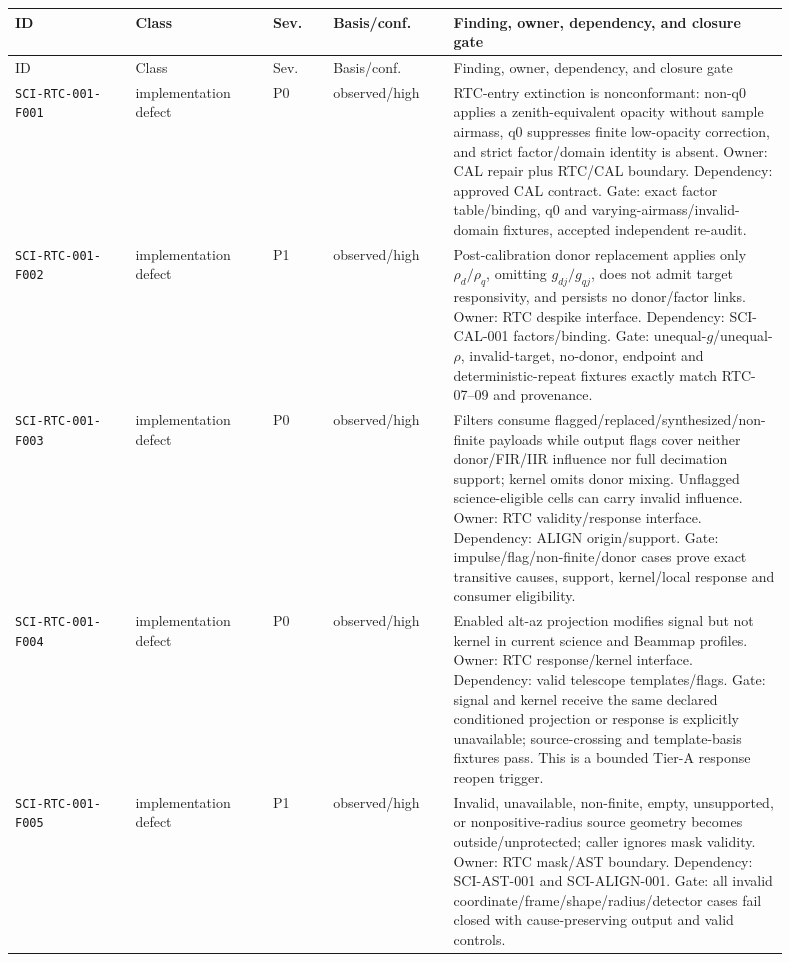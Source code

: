 \documentclass[11pt]{article}
\newcommand{\code}[1]{\nolinkurl{#1}}
\begin{document}
\begin{longtable}{@{}L{0.14\linewidth}L{0.16\linewidth}L{0.07\linewidth}L{0.14\linewidth}L{0.39\linewidth}@{}}
\toprule
ID & Class & Sev. & Basis/conf. & Finding, owner, dependency, and closure gate \\
\midrule
\endfirsthead
\toprule
ID & Class & Sev. & Basis/conf. & Finding, owner, dependency, and closure gate \\
\midrule
\endhead
\code{SCI-RTC-001-F001} & implementation defect & P0 & observed/high & RTC-entry extinction is nonconformant: non-q0 applies a zenith-equivalent opacity without sample airmass, q0 suppresses finite low-opacity correction, and strict factor/domain identity is absent. Owner: CAL repair plus RTC/CAL boundary. Dependency: approved CAL contract. Gate: exact factor table/binding, q0 and varying-airmass/invalid-domain fixtures, accepted independent re-audit. \\
\code{SCI-RTC-001-F002} & implementation defect & P1 & observed/high & Post-calibration donor replacement applies only $\rho_d/\rho_q$, omitting $g_{dj}/g_{qj}$, does not admit target responsivity, and persists no donor/factor links. Owner: RTC despike interface. Dependency: SCI-CAL-001 factors/binding. Gate: unequal-$g$/unequal-$\rho$, invalid-target, no-donor, endpoint and deterministic-repeat fixtures exactly match RTC-07--09 and provenance. \\
\code{SCI-RTC-001-F003} & implementation defect & P0 & observed/high & Filters consume flagged/replaced/synthesized/non-finite payloads while output flags cover neither donor/FIR/IIR influence nor full decimation support; kernel omits donor mixing. Unflagged science-eligible cells can carry invalid influence. Owner: RTC validity/response interface. Dependency: ALIGN origin/support. Gate: impulse/flag/non-finite/donor cases prove exact transitive causes, support, kernel/local response and consumer eligibility. \\
\code{SCI-RTC-001-F004} & implementation defect & P0 & observed/high & Enabled alt-az projection modifies signal but not kernel in current science and Beammap profiles. Owner: RTC response/kernel interface. Dependency: valid telescope templates/flags. Gate: signal and kernel receive the same declared conditioned projection or response is explicitly unavailable; source-crossing and template-basis fixtures pass. This is a bounded Tier-A response reopen trigger. \\
\code{SCI-RTC-001-F005} & implementation defect & P1 & observed/high & Invalid, unavailable, non-finite, empty, unsupported, or nonpositive-radius source geometry becomes outside/unprotected; caller ignores mask validity. Owner: RTC mask/AST boundary. Dependency: SCI-AST-001 and SCI-ALIGN-001. Gate: all invalid coordinate/frame/shape/radius/detector cases fail closed with cause-preserving output and valid controls. \\

\end{longtable}
\end{document}
